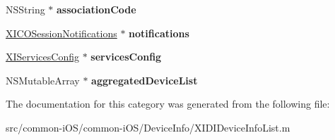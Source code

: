 \begin{DoxyCompactItemize}
N\+S\+String $\ast$ {\bfseries association\+Code}
\item 
\hypertarget{category_x_i_d_i_device_info_list_07_08_a35e9f5294523c2e5e4d0eeea009a4561}{}\label{category_x_i_d_i_device_info_list_07_08_a35e9f5294523c2e5e4d0eeea009a4561} 
\hyperlink{interface_x_i_c_o_session_notifications}{X\+I\+C\+O\+Session\+Notifications} $\ast$ {\bfseries notifications}
\item 
\hypertarget{category_x_i_d_i_device_info_list_07_08_a34bbd1068b47cd5310a60c55cfdb34a8}{}\label{category_x_i_d_i_device_info_list_07_08_a34bbd1068b47cd5310a60c55cfdb34a8} 
\hyperlink{interface_x_i_services_config}{X\+I\+Services\+Config} $\ast$ {\bfseries services\+Config}
\item 
\hypertarget{category_x_i_d_i_device_info_list_07_08_a9bb22cc58f28b5743a700ad287000e89}{}\label{category_x_i_d_i_device_info_list_07_08_a9bb22cc58f28b5743a700ad287000e89} 
N\+S\+Mutable\+Array $\ast$ {\bfseries aggregated\+Device\+List}
\end{DoxyCompactItemize}


The documentation for this category was generated from the following file\+:\begin{DoxyCompactItemize}
\item 
src/common-\/i\+O\+S/common-\/i\+O\+S/\+Device\+Info/X\+I\+D\+I\+Device\+Info\+List.\+m\end{DoxyCompactItemize}
